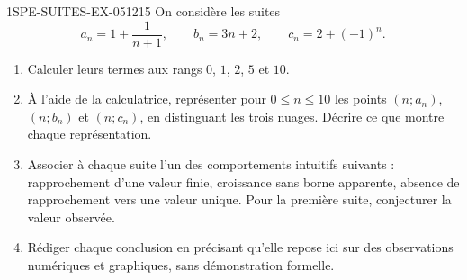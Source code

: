 \begin{exercice}{1SPE-SUITES-EX-051}{2}{15}
On considère les suites
\[a_n=1+\frac{1}{n+1},\qquad b_n=3n+2,\qquad c_n=2+(-1)^n.\]

\begin{enumerate}
  \item Calculer leurs termes aux rangs $0$, $1$, $2$, $5$ et $10$.
  \item À l'aide de la calculatrice, représenter pour $0\leq n\leq 10$ les points $(n;a_n)$, $(n;b_n)$ et $(n;c_n)$, en distinguant les trois nuages. Décrire ce que montre chaque représentation.
  \item Associer à chaque suite l'un des comportements intuitifs suivants : rapprochement d'une valeur finie, croissance sans borne apparente, absence de rapprochement vers une valeur unique. Pour la première suite, conjecturer la valeur observée.
  \item Rédiger chaque conclusion en précisant qu'elle repose ici sur des observations numériques et graphiques, sans démonstration formelle.
\end{enumerate}
\end{exercice}
